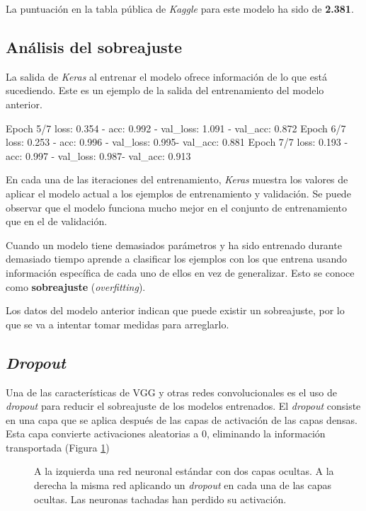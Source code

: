 La puntuación en la tabla pública de \textit{Kaggle} para este modelo ha sido
de \textbf{2.381}.

\subsection{Análisis del sobreajuste}

La salida de \textit{Keras} al entrenar el modelo ofrece información de lo que
está sucediendo. Este es un ejemplo de la salida del entrenamiento del modelo
anterior.

\begin{python}
Epoch 5/7
loss: 0.354 - acc: 0.992 - val_loss: 1.091 - val_acc: 0.872
Epoch 6/7
loss: 0.253 - acc: 0.996 - val_loss: 0.995- val_acc: 0.881
Epoch 7/7
loss: 0.193 - acc: 0.997 - val_loss: 0.987- val_acc: 0.913
\end{python}

En cada una de las iteraciones del entrenamiento, \textit{Keras} muestra los
valores de aplicar el modelo actual a los ejemplos de entrenamiento y
validación. Se puede observar que el modelo funciona mucho mejor en el conjunto
de entrenamiento que en el de validación.

Cuando un modelo tiene demasiados parámetros y ha sido entrenado durante demasiado tiempo aprende a clasificar los ejemplos con los que entrena usando información específica de cada uno de ellos en vez de generalizar. Esto se conoce como \textbf{sobreajuste} (\textit{overfitting}).

Los datos del modelo anterior indican que puede existir un sobreajuste, por lo que se va a intentar tomar medidas para arreglarlo.

\subsection{\textit{Dropout}}
\label{sec:dropout}

Una de las características de VGG y otras redes convolucionales es el uso de
\textit{dropout} para reducir el sobreajuste de los modelos entrenados. El
\textit{dropout} consiste en una capa que se aplica después de las capas de
activación de las capas densas. Esta capa convierte activaciones aleatorias a
0, eliminando la información transportada (Figura \ref{dropout-net})

\begin{figure}
    \caption{A la izquierda una red neuronal estándar con dos capas ocultas. A la derecha la misma red aplicando un \textit{dropout} en cada una de las capas ocultas. Las neuronas tachadas han perdido su activación.}
\label{dropout-net}
\end{figure}


